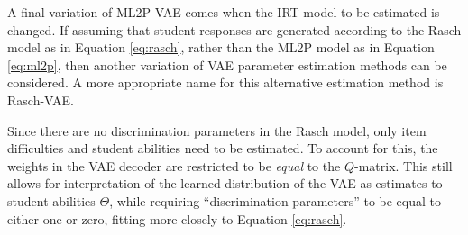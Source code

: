 A final variation of ML2P-VAE comes when the IRT model to be estimated is changed. If assuming that student responses are generated according to the Rasch model as in Equation \ref{eq:rasch}, rather than the ML2P model as in Equation \ref{eq:ml2p}, then another variation of VAE parameter estimation methods can be considered. A more appropriate name for this alternative estimation method is Rasch-VAE.

Since there are no discrimination parameters in the Rasch model, only item difficulties and student abilities need to be estimated. To account for this, the weights in the VAE decoder are restricted to be \textit{equal} to the $Q$-matrix. This still allows for interpretation of the learned distribution of the VAE as estimates to student abilities $\Theta$, while requiring ``discrimination parameters'' to be equal to either one or zero, fitting more closely to Equation \ref{eq:rasch}.

